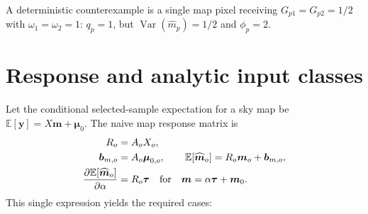 \documentclass[11pt]{article}
\newcommand{\E}{\mathbb{E}}
\newcommand{\Var}{\operatorname{Var}}
\begin{document}
A deterministic counterexample is a single map pixel receiving
\(G_{p1}=G_{p2}=1/2\) with \(\omega_1=\omega_2=1\):
\(q_p=1\), but \(\Var(\widehat m_p)=1/2\) and \(\phi_p=2\).

\section{Response and analytic input classes}

Let the conditional selected-sample expectation for a sky map be
\(\E[\boldsymbol y]=X\boldsymbol m+\boldsymbol\mu_0\). The naive map response
matrix is
\begin{align}
 R_o&=A_oX_o,
 \label{eq:naive-response}\\
 \boldsymbol b_{m,o}&=A_o\boldsymbol\mu_{0,o},
 \qquad
 \E[\widehat{\boldsymbol m}_o]=
 R_o\boldsymbol m_o+\boldsymbol b_{m,o},
 \label{eq:map-affine-mean}\\
 \frac{\partial\E[\widehat{\boldsymbol m}_o]}{\partial\alpha}
 &=R_o\boldsymbol\tau
 \quad\hbox{for}\quad
 \boldsymbol m=\alpha\boldsymbol\tau+\boldsymbol m_0.
 \label{eq:template-response}
\end{align}
This single expression yields the required cases:
\end{document}
